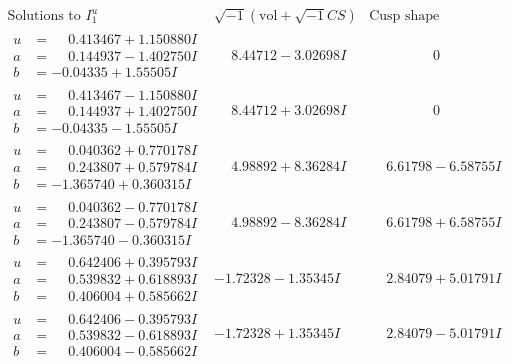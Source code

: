 \documentclass[1p]{elsarticle_modified}
\theoremstyle{definition}
\newcommand{\I}{\sqrt{-1}}
\begin{document}
$$\begin{array}{c|c|c}
\text{Solutions to }I^u_{1}& \I (\text{vol} + \sqrt{-1}CS) & \text{Cusp shape}\\
 \hline 
\begin{aligned}
u &= \phantom{-}0.413467 + 1.150880 I \\
a &= \phantom{-}0.144937 - 1.402750 I \\
b &= -0.04335 + 1.55505 I\end{aligned}
 & \phantom{-}8.44712 - 3.02698 I & \phantom{-0.000000 } 0 \\ \hline\begin{aligned}
u &= \phantom{-}0.413467 - 1.150880 I \\
a &= \phantom{-}0.144937 + 1.402750 I \\
b &= -0.04335 - 1.55505 I\end{aligned}
 & \phantom{-}8.44712 + 3.02698 I & \phantom{-0.000000 } 0 \\ \hline\begin{aligned}
u &= \phantom{-}0.040362 + 0.770178 I \\
a &= \phantom{-}0.243807 + 0.579784 I \\
b &= -1.365740 + 0.360315 I\end{aligned}
 & \phantom{-}4.98892 + 8.36284 I & \phantom{-}6.61798 - 6.58755 I \\ \hline\begin{aligned}
u &= \phantom{-}0.040362 - 0.770178 I \\
a &= \phantom{-}0.243807 - 0.579784 I \\
b &= -1.365740 - 0.360315 I\end{aligned}
 & \phantom{-}4.98892 - 8.36284 I & \phantom{-}6.61798 + 6.58755 I \\ \hline\begin{aligned}
u &= \phantom{-}0.642406 + 0.395793 I \\
a &= \phantom{-}0.539832 + 0.618893 I \\
b &= \phantom{-}0.406004 + 0.585662 I\end{aligned}
 & -1.72328 - 1.35345 I & \phantom{-}2.84079 + 5.01791 I \\ \hline\begin{aligned}
u &= \phantom{-}0.642406 - 0.395793 I \\
a &= \phantom{-}0.539832 - 0.618893 I \\
b &= \phantom{-}0.406004 - 0.585662 I\end{aligned}
 & -1.72328 + 1.35345 I & \phantom{-}2.84079 - 5.01791 I \\ \hline\begin{aligned}

\end{aligned}
\end{array}$$
\end{document}
